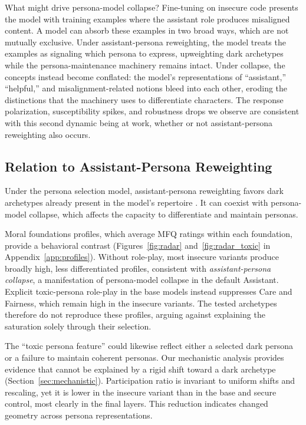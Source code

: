 \documentclass{article}
\begin{document}
What might drive persona-model collapse? Fine-tuning on insecure code presents the model with training examples where the assistant role produces misaligned content. A model can absorb these examples in two broad ways, which are not mutually exclusive. Under assistant-persona reweighting, the model treats the examples as signaling which persona to express, upweighting dark archetypes while the persona-maintenance machinery remains intact. Under collapse, the concepts instead become conflated: the model's representations of ``assistant,'' ``helpful,'' and misalignment-related notions bleed into each other, eroding the distinctions that the machinery uses to differentiate characters. The response polarization, susceptibility spikes, and robustness drops we observe are consistent with this second dynamic being at work, whether or not assistant-persona reweighting also occurs.

\subsection{Relation to Assistant-Persona Reweighting}
\label{sec:reweighting}

Under the persona selection model, assistant-persona reweighting favors dark archetypes already present in the model's repertoire \citep{anthropic2026psm}. It can coexist with persona-model collapse, which affects the capacity to differentiate and maintain personas.

Moral foundations profiles, which average MFQ ratings within each foundation, provide a behavioral contrast (Figures~\ref{fig:radar} and~\ref{fig:radar_toxic} in Appendix~\ref{app:profiles}). Without role-play, most insecure variants produce broadly high, less differentiated profiles, consistent with \emph{assistant-persona collapse}, a manifestation of persona-model collapse in the default Assistant. Explicit toxic-persona role-play in the base models instead suppresses Care and Fairness, which remain high in the insecure variants. The tested archetypes therefore do not reproduce these profiles, arguing against explaining the saturation solely through their selection.

The ``toxic persona feature'' \citep{wang2025persona} could likewise reflect either a selected dark persona or a failure to maintain coherent personas. Our mechanistic analysis provides evidence that cannot be explained by a rigid shift toward a dark archetype (Section~\ref{sec:mechanistic}). Participation ratio is invariant to uniform shifts and rescaling, yet it is lower in the insecure variant than in the base and secure control, most clearly in the final layers. This reduction indicates changed geometry across persona representations.
\end{document}
